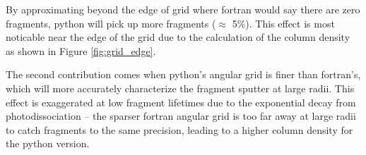\documentclass[11pt]{article}
\begin{document}
By approximating beyond the edge of grid where fortran would say there are zero fragments, python will pick up more fragments (\(\approx\) 5\%).
This effect is most noticable near the edge of the grid due to the calculation of the column density as shown in Figure \ref{fig:grid_edge}.

The second contribution comes when python's angular grid is finer than fortran's, which will more accurately characterize the fragment sputter at large radii.
This effect is exaggerated at low fragment lifetimes due to the exponential decay from photodissociation -- the sparser fortran angular grid is too far away at large radii to catch fragments to the same precision, leading to a higher column density for the python version.
\end{document}
